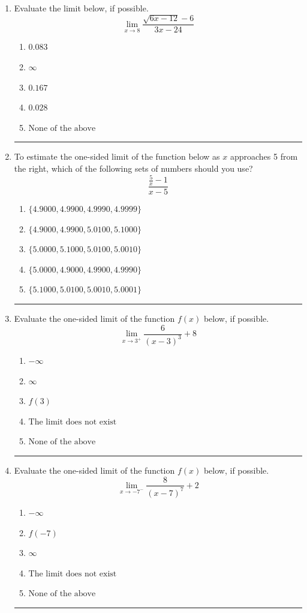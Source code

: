 \documentclass[14pt]{extbook}
\newcommand{\litem}[1]{\item#1\hspace*{-1cm}\rule{\textwidth}{0.4pt}}
\begin{document}
\begin{enumerate}
\litem{
Evaluate the limit below, if possible.\[ \lim_{x \rightarrow 8} \frac{\sqrt{6x - 12} - 6}{3x - 24} \]\begin{enumerate}[label=\Alph*.]
\item \( 0.083 \)
\item \( \infty \)
\item \( 0.167 \)
\item \( 0.028 \)
\item \( \text{None of the above} \)

\end{enumerate} }
\litem{
To estimate the one-sided limit of the function below as $x$ approaches 5 from the right, which of the following sets of numbers should you use?\[ \frac{\frac{5}{x} - 1}{x - 5} \]\begin{enumerate}[label=\Alph*.]
\item \( \{ 4.9000, 4.9900, 4.9990, 4.9999 \} \)
\item \( \{ 4.9000, 4.9900, 5.0100, 5.1000 \} \)
\item \( \{ 5.0000, 5.1000, 5.0100, 5.0010 \} \)
\item \( \{ 5.0000, 4.9000, 4.9900, 4.9990 \} \)
\item \( \{ 5.1000, 5.0100, 5.0010, 5.0001 \} \)

\end{enumerate} }
\litem{
Evaluate the one-sided limit of the function $f(x)$ below, if possible.\[ \lim_{x \rightarrow 3^+} \frac{6}{(x-3)^3}+8 \]\begin{enumerate}[label=\Alph*.]
\item \( -\infty \)
\item \( \infty \)
\item \( f(3) \)
\item \( \text{The limit does not exist} \)
\item \( \text{None of the above} \)

\end{enumerate} }
\litem{
Evaluate the one-sided limit of the function $f(x)$ below, if possible.\[ \lim_{x \rightarrow -7^-} \frac{8}{(x-7)^7}+2 \]\begin{enumerate}[label=\Alph*.]
\item \( -\infty \)
\item \( f(-7) \)
\item \( \infty \)
\item \( \text{The limit does not exist} \)
\item \( \text{None of the above} \)


\end{enumerate}}
\end{enumerate}
\end{document}
